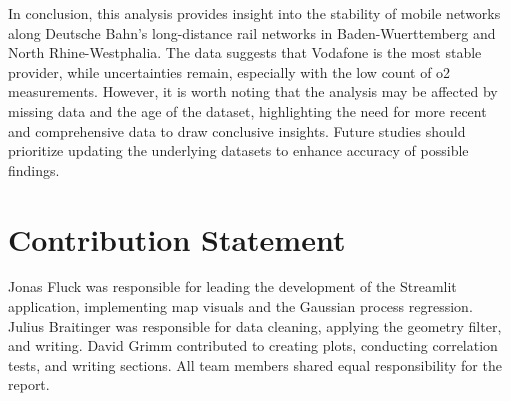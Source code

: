 \documentclass{article}
\theoremstyle{plain}
\theoremstyle{definition}
\theoremstyle{remark}
\begin{document}
In conclusion, this analysis provides insight into the stability of mobile networks along Deutsche Bahn's long-distance rail networks in Baden-Wuerttemberg and North Rhine-Westphalia. The data suggests that Vodafone is the most stable provider, while uncertainties remain, especially with the low count of o2 measurements. However, it is worth noting that the analysis may be affected by missing data and the age of the dataset, highlighting the need for more recent and comprehensive data to draw conclusive insights. Future studies should prioritize updating the underlying datasets to enhance accuracy of possible findings.
\section*{Contribution Statement}
Jonas Fluck was responsible for leading the development of the Streamlit application, implementing map visuals and the Gaussian process regression. Julius Braitinger was responsible for data cleaning, applying the geometry filter, and writing. David Grimm contributed to creating plots, conducting correlation tests, and writing sections. All team members shared equal responsibility for the report.
\newpage


\end{document}
